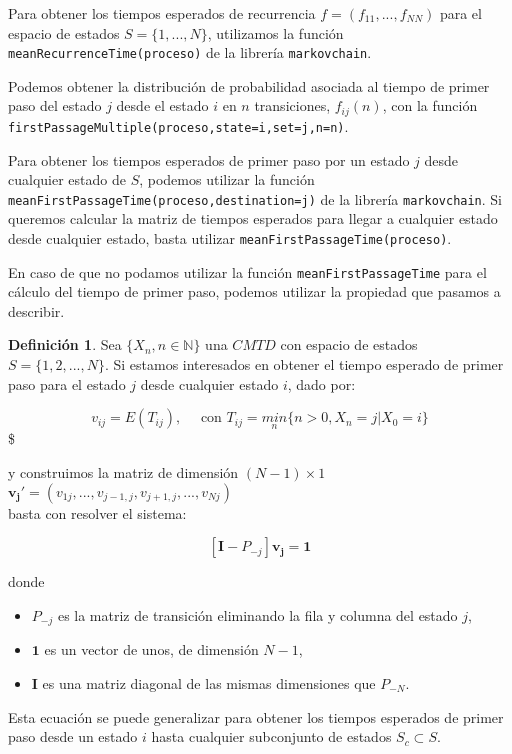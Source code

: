 \documentclass[
]{book}
\providecommand{\tightlist}{%
  \setlength{\itemsep}{0pt}\setlength{\parskip}{0pt}}
\newenvironment{yellowbox}{
  \definecolor{shadecolor}{rgb}{210, 180, 140}  
  \color{black}
  \begin{shaded}}
 {\end{shaded}}
\newenvironment{whitebox}{
  \definecolor{shadecolor}{rgb}{255, 255, 255}  
  \color{black}
  \begin{shaded}}
 {\end{shaded}}
\theoremstyle{definition}
\newtheorem{definition}{Definición}[chapter]
\theoremstyle{definition}
\theoremstyle{definition}
\theoremstyle{definition}
\theoremstyle{remark}
\begin{document}
\begin{whitebox}
Para obtener los tiempos esperados de recurrencia \(f=(f_{11},...,f_{NN})\) para el espacio de estados \(S=\{1,...,N\}\), utilizamos la función \texttt{meanRecurrenceTime(proceso)} de la librería \texttt{markovchain}.

Podemos obtener la distribución de probabilidad asociada al tiempo de primer paso del estado \(j\) desde el estado \(i\) en \(n\) transiciones, \(f_{ij}(n)\), con la función \texttt{firstPassageMultiple(proceso,state=i,set=j,n=n)}.

\end{whitebox}

\begin{whitebox}
Para obtener los tiempos esperados de primer paso por un estado \(j\) desde cualquier estado de \(S\), podemos utilizar la función \texttt{meanFirstPassageTime(proceso,destination=j)} de la librería \texttt{markovchain}. Si queremos calcular la matriz de tiempos esperados para llegar a cualquier estado desde cualquier estado, basta utilizar \texttt{meanFirstPassageTime(proceso)}.

\end{whitebox}

En caso de que no podamos utilizar la función \texttt{meanFirstPassageTime} para el cálculo del tiempo de primer paso, podemos utilizar la propiedad que pasamos a describir.

\begin{yellowbox}

\begin{definition}
Sea \(\{X_n, n \in \mathbb{N}\}\) una \(CMTD\) con espacio de estados \(S = \{1, 2,...,N\}\). Si estamos interesados en obtener el tiempo esperado de primer paso para el estado \(j\) desde cualquier estado \(i\), dado por:

\[v_{ij} = E(T_{ij}), \quad \text{ con } T_{ij} = \underset{n}{min}\{n > 0, X_n = j | X_0 = i\}\]\$

y construimos la matriz de dimensión \((N-1) \times 1\) \(\mathbf{v_j'}=(v_{1j},...,v_{j-1,j},v_{j+1,j},...,v_{Nj})\)\\
basta con resolver el sistema:

\[[\mathbf{I} - P_{-j}]\mathbf{v_j} = \mathbf{1}\]

donde

\begin{itemize}
\tightlist
\item
  \(P_{-j}\) es la matriz de transición eliminando la fila y columna del estado \(j\),
\item
  \(\mathbf{1}\) es un vector de unos, de dimensión \(N-1\),
\item
  \(\mathbf{I}\) es una matriz diagonal de las mismas dimensiones que \(P_{-N}\).
\end{itemize}

Esta ecuación se puede generalizar para obtener los tiempos esperados de primer paso desde un estado \(i\) hasta cualquier subconjunto de estados \(S_c \subset S\).
\end{definition}

\end{yellowbox}
\end{document}
